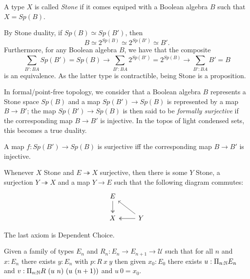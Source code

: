 \begin{definition}
  A type $X$ is called \textit{Stone} if it comes equiped with a Boolean algebra $B$ such that
  $X = Sp(B)$. 
\end{definition}
\begin{remark}
  By Stone duality, if $Sp(B) \simeq  Sp(B')$, then $$B \simeq 2^{Sp(B)} \simeq 2^{Sp(B')} \simeq B'.$$
  Furthermore, for any Boolean algebra $B$, we have that the composite
  $$ 
  \sum\limits_{B' : BA} Sp(B') = Sp(B) \to 
  \sum\limits_{B' : BA} 2^{Sp(B')} = 2^{Sp(B)} \to
  \sum\limits_{B' : BA} B' = B 
  $$ 
  is an equivalence. As the latter type is contractible, being Stone is a proposition. 
\end{remark} 

In formal/point-free topology, we consider that a Boolean algebra $B$ represents a Stone space $Sp(B)$ and a map
$Sp(B') \to Sp(B)$ is represented by a map $B\rightarrow B'$; the map $Sp(B')\to Sp(B)$ is then said to be
{\em formally surjective} if the corresponding map $B\to B'$ is injective. In the topos of light condensed sets,
this becomes a true duality.

\begin{axiom}
  A map $f:Sp(B')\to Sp(B)$ is surjective iff the corresponding map $B \to B'$ is injective.
\end{axiom} 

\begin{axiom}
  Whenever $X$ Stone and $E\twoheadrightarrow X$ surjective, then there is some $Y$ Stone,
    a surjection $Y \twoheadrightarrow X$ and a map $Y\to E$ such that the following diagram commutes:
    \begin{equation}\begin{tikzcd}
      E \arrow[d,""',two heads]\\
      X & \arrow[l, "", two heads] Y\arrow[lu, ""']
    \end{tikzcd}\end{equation}  
\end{axiom} 



The last axiom is Dependent Choice.



\begin{axiom}
  Given a family of types $E_n$ and $R_n:E_n\rightarrow E_{n+1}\rightarrow {\mathcal U}$ such that
  for all $n$ and $x:E_n$ there exists $y:E_n$ with $p:R~x~y$ then given $x_0:E_0$ there exists
  $u:\Pi_{n:\mathbb{N}}E_n$ and $v:\Pi_{n:\mathbb{N}}R~(u~n)~(u~(n+1))$ and $u~0 = x_0$.
\end{axiom}
